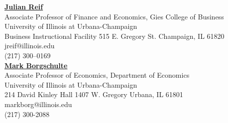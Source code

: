 \documentclass[a4paper,9pt]{extarticle}
\begin{document}
\noindent
\textbf{\href{https://julianreif.com}{Julian Reif}} \\
Associate Professor of Finance and Economics, Gies College of Business \\
University of Illinois at Urbana-Champaign \\
Business Instructional Facility 515 E. Gregory St.
Champaign, IL 61820\\
jreif@illinois.edu \\
(217) 300–0169 \\

\noindent
\textbf{\href{https://sites.google.com/site/markborgschulte/home}{Mark Borgschulte}} \\
Associate Professor of Economics, Department of Economics \\
University of Illinois at Urbana-Champaign \\
214 David Kinley Hall
1407 W. Gregory
Urbana, IL  61801\\
markborg@illinois.edu \\
(217) 300-2088 \\
\end{document}
